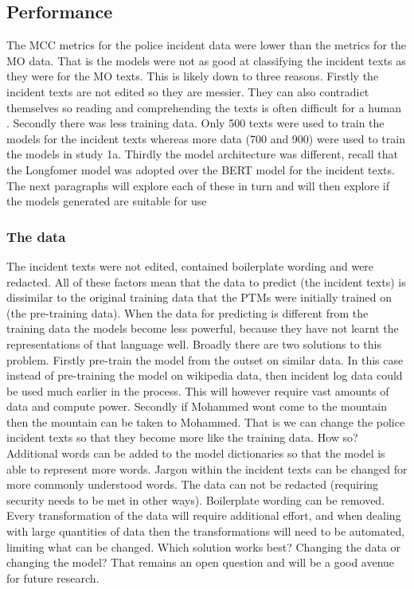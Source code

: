\subsection{Performance} The MCC metrics for the police incident data were lower than the metrics for the MO data. That is the models were not as good at classifying the incident texts as they were for the MO texts. This is likely down to three reasons. Firstly the incident texts are not edited so they are messier. They can also contradict themselves so reading and comprehending the texts is often difficult for a human . Secondly there was less training data. Only 500 texts were used to train the models for the incident texts whereas more data (700 and 900) were used to train the models in study 1a. Thirdly the model architecture was different, recall that the Longfomer model was adopted over the BERT model for the incident texts. The next paragraphs will explore each of these in turn and will then explore if the models generated are suitable for use

\subsubsection{The data} The incident texts were not edited, contained boilerplate wording and were redacted. All of these factors mean that the data to predict (the incident texts) is dissimilar to the original training data that the PTMs were initially trained on (the pre-training data). When the data for predicting is different from the training data the models become less powerful, because they have not learnt the representations of that language well. Broadly there are two solutions to this problem. Firstly pre-train the model from the outset on similar data. In this case instead of pre-training the model on wikipedia data, then incident log data could be used much earlier in the process. This will however require vast amounts of data and compute power. Secondly if Mohammed wont come to the mountain then the mountain can be taken to Mohammed.  That is we can change the police incident texts so that they become more like the training data. How so? Additional words can be added to the model dictionaries so that the model is able to represent more words. Jargon within the incident texts can be changed for more commonly understood words. The data can not be redacted (requiring security needs to be met in other ways). Boilerplate wording can be removed.  Every transformation of the data  will require additional effort, and when dealing with large quantities of data then the transformations will need to be automated, limiting what can be changed. Which solution works best? Changing the data or changing the model? That remains an open question and will be a good avenue for future research.   

